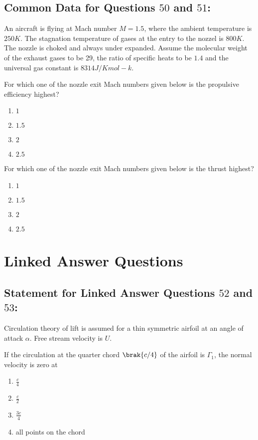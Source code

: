 \subsection*{Common Data for Questions $50$ and $51$:} An aircraft is flying at Mach number $M=1.5$, where the ambient temperature is $250 K$. The stagnation temperature of gases at the entry to the nozzel is $800 K$. The nozzle is choked and always under expanded. Assume the molecular weight of the exhaust gases to be 29, the ratio of specific heats to be $1.4$ and the universal gas constant is $8314 J/Kmol-k.$
\item For which one of the nozzle exit Mach numbers given below is the propulsive efficiency highest?
	\begin{enumerate}
		\item $1$ \item $1.5$\item $2$\item $2.5$
	\end{enumerate}
\item For which one of the nozzle exit Mach numbers given below is the thrust highest?
        \begin{enumerate}
                \item $1$ \item $1.5$\item $2$\item $2.5$
        \end{enumerate}
	\section*{Linked Answer Questions}
	\subsection*{Statement for Linked Answer Questions $52$ and $53$:} Circulation theory of lift is assumed for a thin symmetric airfoil at an angle of attack $\alpha$. Free stream velocity is $U$.
\item If the circulation at the quarter chord $\brak{c/4}$ of the airfoil is $\Gamma _1$, the normal velocity is zero at
	\begin{enumerate}
		\item $\frac{c}{4}$
		\item $\frac{c}{2}$
		\item $\frac{3c}{4}$
		\item all points on the chord
	\end{enumerate}

